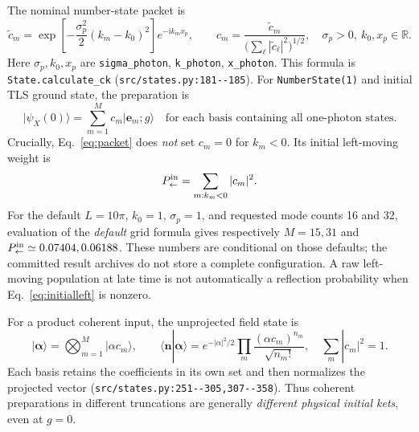 \documentclass[11pt,a4paper]{article}
\newcommand{\ket}[1]{\lvert #1\rangle}
\newcommand{\code}[1]{\nolinkurl{#1}}
\newcommand{\ii}{\mathrm i}
\begin{document}
The nominal number-state packet is
\begin{equation}
 \widetilde c_m=
 \exp\!\left[-\frac{\sigma_p^2}{2}(k_m-k_0)^2\right]
 e^{-\ii k_m x_p},\qquad
 c_m=\frac{\widetilde c_m}{\bigl(\sum_\ell|\widetilde c_\ell|^2\bigr)^{1/2}},
 \quad\sigma_p>0,\ k_0,x_p\in\mathbb R.
 \label{eq:packet}
\end{equation}
Here $\sigma_p,k_0,x_p$ are \code{sigma_photon}, \code{k_photon}, \code{x_photon}. This formula is \code{State.calculate_ck} (\code{src/states.py:181--185}). For \code{NumberState(1)} and initial TLS ground state, the preparation is
\begin{equation}
 \ket{\psi_X(0)}=\sum_{m=1}^M c_m\ket{\mathbf e_m;g}
 \quad\text{for each basis containing all one-photon states}.
 \label{eq:numberinitial}
\end{equation}
Crucially, Eq.~\eqref{eq:packet} does \emph{not} set $c_m=0$ for $k_m<0$. Its initial left-moving weight is
\begin{equation}
 P_{\leftarrow}^{\rm in}=\sum_{m:k_m<0}|c_m|^2.
 \label{eq:initialleft}
\end{equation}
For the default $L=10\pi$, $k_0=1$, $\sigma_p=1$, and requested mode counts 16 and 32, evaluation of the \emph{default} grid formula gives respectively $M=15,31$ and $P_{\leftarrow}^{\rm in}\simeq0.07404,0.06188$. These numbers are conditional on those defaults; the committed result archives do not store a complete configuration. A raw left-moving population at late time is not automatically a reflection probability when Eq.~\eqref{eq:initialleft} is nonzero.

For a product coherent input, the unprojected field state is
\begin{equation}
 \ket{\boldsymbol\alpha}=\bigotimes_{m=1}^M\ket{\alpha c_m},\qquad
 \langle\mathbf n|\boldsymbol\alpha\rangle
 =e^{-|\alpha|^2/2}\prod_m\frac{(\alpha c_m)^{n_m}}{\sqrt{n_m!}},
 \quad\sum_m|c_m|^2=1.
 \label{eq:coherent}
\end{equation}
Each basis retains the coefficients in its own set and then normalizes the projected vector (\code{src/states.py:251--305,307--358}). Thus coherent preparations in different truncations are generally \emph{different physical initial kets}, even at $g=0$.
\end{document}

